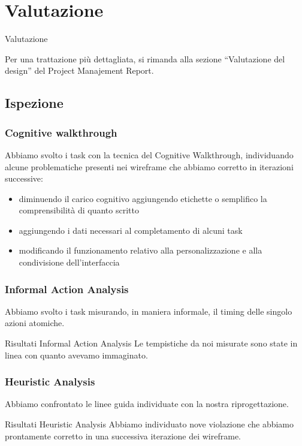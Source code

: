 \documentclass[handout]{beamer}
\begin{document}
	\section{Valutazione}
		\begin{frame}
			\centering
			\begin{Huge}
				Valutazione
			\end{Huge}
			\mbox{}
			\vfill
			\vspace*{100px}
			\begin{tiny}
				Per una trattazione più dettagliata, si rimanda alla sezione ``Valutazione del design'' del Project Manajement Report.
			\end{tiny}
		\end{frame}
		\subsection{Ispezione}
		\begin{frame}
			\frametitle{Cognitive walkthrough}
			Abbiamo svolto i task con la tecnica del Cognitive Walkthrough, individuando alcune problematiche presenti nei wireframe che abbiamo corretto in iterazioni successive:
			\begin{itemize}[<+->]
				\item diminuendo il carico cognitivo aggiungendo etichette o semplifico la comprensibilità di quanto scritto\\
				\item aggiungendo i dati necessari al completamento di alcuni task\\
				\item modificando il funzionamento relativo alla personalizzazione e alla condivisione dell'interfaccia\\
			\end{itemize}
		\end{frame}

		\begin{frame}
			\frametitle{Informal Action Analysis}
			Abbiamo svolto i task misurando, in maniera informale, il timing delle singolo azioni atomiche. \newline \newline
			\begin{block}{Risultati Informal Action Analysis}
			Le tempistiche da noi misurate sono state in linea con quanto avevamo immaginato.
		\end{block}
		\end{frame}

		\begin{frame}
			\frametitle{Heuristic Analysis}
			Abbiamo confrontato le linee guida individuate con la nostra riprogettazione. \newline \newline
			\begin{block}{Risultati Heuristic Analysis}
				Abbiamo individuato nove violazione che abbiamo prontamente corretto in una successiva iterazione dei wireframe.
		\end{block}
		\end{frame}
\end{document}
